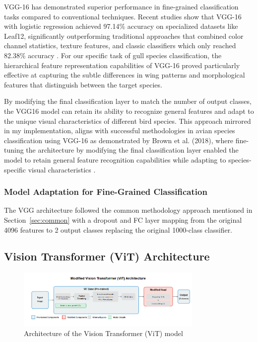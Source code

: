 \documentclass[a4paper,12pt]{report}
\begin{document}
VGG-16 has demonstrated superior performance in fine-grained classification tasks compared to conventional techniques. Recent studies show that VGG-16 with logistic regression achieved 97.14\% accuracy on specialized datasets like Leaf12, significantly outperforming traditional approaches that combined color channel statistics, texture features, and classic classifiers which only reached 82.38\% accuracy \citep{pearline2019study}. For our specific task of gull species classification, the hierarchical feature representation capabilities of VGG-16 proved particularly effective at capturing the subtle differences in wing patterns and morphological features that distinguish between the target species.

By modifying the final classification layer to match the number of output classes, the VGG16 model can retain its ability to recognize general features and adapt to the unique visual characteristics of different bird species. This approach mirrored in my implementation, aligns with successful methodologies in avian species classification using VGG-16 as demonstrated by Brown et al. (2018), where fine-tuning the architecture by modifying the final classification layer enabled the model to retain general feature recognition capabilities while adapting to species-specific visual characteristics \citep{10533638}.

\subsubsection{Model Adaptation for Fine-Grained Classification}

The VGG architecture followed the common methodology approach mentioned in Section~\ref{sec:common} with a dropout and FC layer  mapping from the original 4096 features to 2 output classes replacing the original 1000-class classifier.


\subsection{Vision Transformer (ViT) Architecture}

\begin{figure}[H]
    \centering
    \includegraphics[width=0.8\textwidth]{images/architecture/vit.png}
    \caption{Architecture of the Vision Transformer (ViT) model}
    \label{fig:vit_architecture}
\end{figure}
\end{document}
